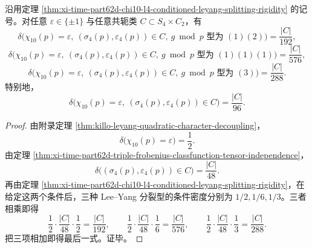 \begin{corollary}\label{cor:xi-time-part62d-chi10-l4-leyang-joint-density-table}
沿用定理 \ref{thm:xi-time-part62d-chi10-l4-conditioned-leyang-splitting-rigidity} 的记号。对任意 \(\varepsilon\in\{\pm1\}\) 与任意共轭类 \(C\subset S_4\times C_2\)，有
\[
\boxed{\;
\delta\!\bigl(\chi_{10}(p)=\varepsilon,\ (\sigma_4(p),\varepsilon_4(p))\in C,\ g\bmod p\text{ 型为 }(1)(2)\bigr)
=\frac{|C|}{192},\;}
\]
\[
\boxed{\;
\delta\!\bigl(\chi_{10}(p)=\varepsilon,\ (\sigma_4(p),\varepsilon_4(p))\in C,\ g\bmod p\text{ 型为 }(1)(1)(1)\bigr)
=\frac{|C|}{576},\;}
\]
\[
\boxed{\;
\delta\!\bigl(\chi_{10}(p)=\varepsilon,\ (\sigma_4(p),\varepsilon_4(p))\in C,\ g\bmod p\text{ 型为 }(3)\bigr)
=\frac{|C|}{288}.\;}
\]
特别地，
\[
\delta\!\bigl(\chi_{10}(p)=\varepsilon,\ (\sigma_4(p),\varepsilon_4(p))\in C\bigr)=\frac{|C|}{96}.
\]
\end{corollary}
\begin{proof}
由附录定理 \ref{thm:killo-leyang-quadratic-character-decoupling}，
\[
\delta\!\bigl(\chi_{10}(p)=\varepsilon\bigr)=\frac12.
\]
由定理 \ref{thm:xi-time-part62d-triple-frobenius-classfunction-tensor-independence}，
\[
\delta\!\bigl((\sigma_4(p),\varepsilon_4(p))\in C\bigr)=\frac{|C|}{48}.
\]
再由定理 \ref{thm:xi-time-part62d-chi10-l4-conditioned-leyang-splitting-rigidity}，在给定这两个条件后，三种 Lee--Yang 分裂型的条件密度分别为 \(1/2,1/6,1/3\)。三者相乘即得
\[
\frac12\cdot\frac{|C|}{48}\cdot\frac12=\frac{|C|}{192},
\qquad
\frac12\cdot\frac{|C|}{48}\cdot\frac16=\frac{|C|}{576},
\qquad
\frac12\cdot\frac{|C|}{48}\cdot\frac13=\frac{|C|}{288}.
\]
把三项相加即得最后一式。证毕。
\end{proof}

